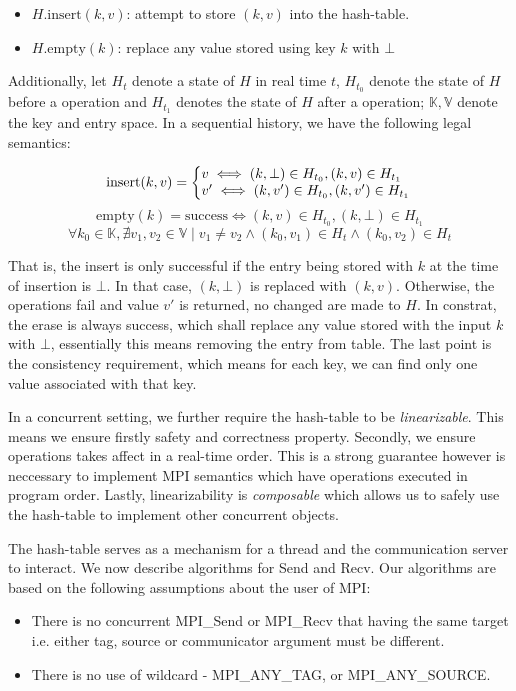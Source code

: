 \documentclass[11pt]{article}
\begin{document}
\begin{itemize}
  \item $H.\text{insert}(k,v)$: attempt to store $(k,v)$ into the hash-table.
  \item $H.\text{empty}(k)$: replace any value stored using key $k$ with $\bot$
\end{itemize}

Additionally, let $H_t$ denote a state of $H$ in real time $t$, $H_{t_0}$ denote the
state of $H$ before a operation and $H_{t_1}$ denotes the state of $H$ after a
operation; $\mathbb{K}, \mathbb{V}$ denote the key and entry space. In a
sequential history, we have the following legal semantics:

\[
  \text{insert}(k, v) = \left\{
    \begin{array}{@{}l@{\thinspace}l}
      v \iff (k,\bot) \in H_{t_0}, (k,v) \in H_{t_1}\\
      v' \iff (k,v') \in H_{t_0}, (k,v') \in H_{t_1}
    \end{array}
    \right.
\]
\[
  \text{empty}(k) = \text{success} \iff  (k,v) \in H_{t_0}, (k,\bot) \in H_{t_1}
\]
\[
  \forall k_0 \in \mathbb{K}, \nexists {v_1, v_2 \in \mathbb{V}}
    \mid {{v_1 \ne v_2} \wedge {(k_0, v_1) \in H_{t} \wedge (k_0, v_2) \in H_{t}}}
\]

That is, the insert is only successful if the entry being stored with $k$ at
the time of insertion is $\bot$.  In that case, $(k,\bot)$ is replaced with
$(k, v)$. Otherwise, the operations fail and value $v'$ is returned, no changed
are made to $H$. In constrat, the erase is always success, which shall replace
any value stored with the input $k$ with $\bot$, essentially this means
removing the entry from table.  The last point is the consistency requirement,
which means for each key, we can find only one value associated with that key.

In a concurrent setting, we further require the hash-table to be
\textit{linearizable}.  This means we ensure firstly safety and correctness
property. Secondly, we ensure operations takes affect in a real-time order.
This is a strong guarantee however is neccessary to implement MPI semantics
which have operations executed in program order. Lastly, linearizability is 
\textit{composable} which allows us to safely use the hash-table to implement
other concurrent objects.

The hash-table serves as a mechanism for a thread and the communication server
to interact. We now describe algorithms for Send and Recv. Our algorithms are
based on the following assumptions about the user of MPI:
\begin{itemize}
  \item There is no concurrent MPI_Send or MPI_Recv
    that having the same target i.e. either tag, source or communicator argument
    must be different.
  \item There is no use of wildcard - MPI_ANY_TAG, or MPI_ANY_SOURCE.
\end{itemize}
\end{document}
